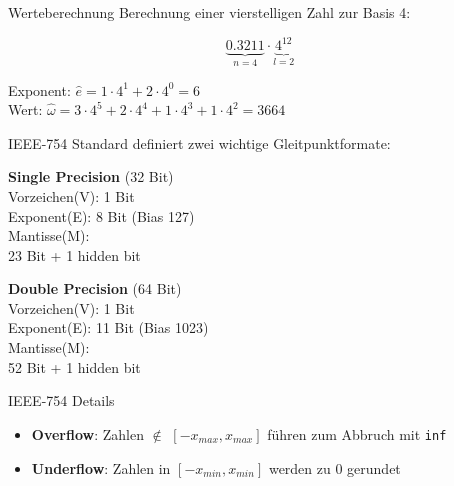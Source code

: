 \begin{example2}{Werteberechnung} Berechnung einer vierstelligen Zahl zur Basis 4:
    \vspace{-2mm}\\
    \begin{minipage}{0.3\textwidth}
        $$\underbrace{0.3211}_{n=4} \cdot \underbrace{4^{12}}_{l=2}$$
    \end{minipage}
    \begin{minipage}[t]{0.65\textwidth}
        Exponent: $\hat{e} = 1 \cdot 4^1 + 2 \cdot 4^0 = 6$ \vspace{1mm}\\
        Wert: $\hat{\omega} = 3 \cdot 4^5 + 2 \cdot 4^4 + 1 \cdot 4^3 + 1 \cdot 4^2 = 3664$
    \end{minipage}
\end{example2}



\begin{concept}{IEEE-754 Standard} \small definiert zwei wichtige Gleitpunktformate:
\vspace{1mm}\\
\begin{minipage}[t]{0.5\textwidth}
    \textbf{Single Precision} (32 Bit)\\
    Vorzeichen(V): 1 Bit\\
    Exponent(E): 8 Bit (Bias 127)\\
    Mantisse(M): \\ 23 Bit + 1 hidden bit
\end{minipage}
\begin{minipage}[t]{0.48\textwidth}
    \textbf{Double Precision} (64 Bit)\\
    Vorzeichen(V): 1 Bit\\
    Exponent(E): 11 Bit (Bias 1023)\\
    Mantisse(M): \\ 52 Bit + 1 hidden bit
\end{minipage}
\end{concept}

\begin{example2}{IEEE-754 Details}
    \small
\begin{itemize}
    \item \textbf{Overflow}: Zahlen $\notin$ $[-x_{max}, x_{max}]$ führen zum Abbruch mit \texttt{inf}
    \item \textbf{Underflow}: Zahlen in $[-x_{min}, x_{min}]$ werden zu 0 gerundet
\end{itemize}
\end{example2}

